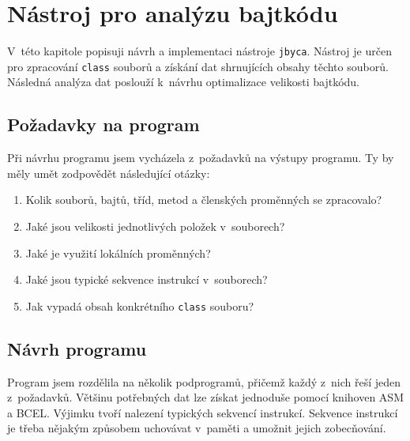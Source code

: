 \chapter{Nástroj pro analýzu bajtkódu}\label{Tool}



V~této kapitole popisuji návrh a implementaci nástroje \texttt{jbyca}. Nástroj je určen pro zpracování \texttt{class} souborů a získání dat shrnujících obsahy těchto souborů. Následná analýza dat poslouží k~návrhu optimalizace velikosti bajtkódu.

\section{Požadavky na program}\label{ToolRequirements}


Při návrhu programu jsem vycházela z~požadavků na výstupy programu.
Ty by měly umět zodpovědět následující otázky: 

\begin{enumerate}
\setlength{\itemsep}{0pt}
\setlength{\parskip}{0pt}
\item Kolik souborů, bajtů, tříd, metod a členských proměnných se zpracovalo? 
\item Jaké jsou velikosti jednotlivých položek v~souborech? 
\item Jaké je využití lokálních proměnných? 
\item Jaké jsou typické sekvence instrukcí v~souborech?
\item Jak vypadá obsah konkrétního \texttt{class} souboru? 
\end{enumerate}

\section{Návrh programu}\label{ToolDesign}

Program jsem rozdělila na několik podprogramů, přičemž každý z~nich řeší jeden z~požadavků. 
Většinu potřebných dat lze získat jednoduše pomocí knihoven ASM a BCEL. Výjimku tvoří nalezení typických sekvencí instrukcí. Sekvence instrukcí je třeba nějakým způsobem uchovávat v~paměti a umožnit jejich zobecňování.

